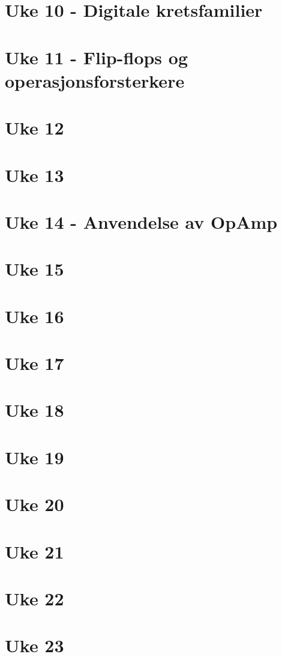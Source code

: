 \documentclass{article}
\begin{document}
  \section{Uke 10 - Digitale kretsfamilier}
    

  \section{Uke 11 - Flip-flops og operasjonsforsterkere}
    

  \section{Uke 12}
    

  \section{Uke 13}
    

  \section{Uke 14 - Anvendelse av OpAmp}
    

  \section{Uke 15}
  \section{Uke 16}
  \section{Uke 17}
  \section{Uke 18}
  \section{Uke 19}
  \section{Uke 20}
  \section{Uke 21}
  \section{Uke 22}
  \section{Uke 23}
\end{document}

